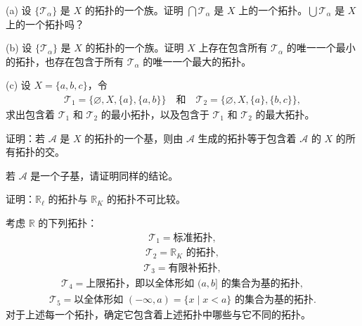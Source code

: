 \documentclass[../../main.tex]{subfiles}
\begin{document}
\begin{exercise}\label{exercise:ch02-拓扑的基-4}
(a) 设 $\{\mathcal{T}_{\alpha}\}$ 是 $X$ 的拓扑的一个族。证明 $\bigcap \mathcal{T}_{\alpha}$ 是 $X$ 上的一个拓扑。$\bigcup \mathcal{T}_{\alpha}$ 是 $X$ 上的一个拓扑吗？

(b) 设 $\{\mathcal{T}_{\alpha}\}$ 是 $X$ 的拓扑的一个族。证明 $X$ 上存在包含所有 $\mathcal{T}_{\alpha}$ 的唯一一个最小的拓扑，也存在包含于所有 $\mathcal{T}_{\alpha}$ 的唯一一个最大的拓扑。

(c) 设 $X = \{a, b, c\}$，令
\begin{align*}
\mathcal{T}_{1} = \{\varnothing, X, \{a\}, \{a, b\}\} \quad \text{和} \quad \mathcal{T}_{2} = \{\varnothing, X, \{a\}, \{b, c\}\},
\end{align*}
求出包含着 $\mathcal{T}_{1}$ 和 $\mathcal{T}_{2}$ 的最小拓扑，以及包含于 $\mathcal{T}_{1}$ 和 $\mathcal{T}_{2}$ 的最大拓扑。
\end{exercise}

\begin{exercise}\label{exercise:ch02-拓扑的基-5}
证明：若 $\mathcal{A}$ 是 $X$ 的拓扑的一个基，则由 $\mathcal{A}$ 生成的拓扑等于包含着 $\mathcal{A}$ 的 $X$ 的所有拓扑的交。

若 $\mathcal{A}$ 是一个子基，请证明同样的结论。
\end{exercise}

\begin{exercise}\label{exercise:ch02-拓扑的基-6}
证明：$\mathbb{R}_{\ell}$ 的拓扑与 $\mathbb{R}_{K}$ 的拓扑不可比较。
\end{exercise}

\begin{exercise}\label{exercise:ch02-拓扑的基-7}
考虑 $\mathbb{R}$ 的下列拓扑：
\begin{align*}
\mathcal{T}_{1} = \text{标准拓扑},
\end{align*}
\begin{align*}
\mathcal{T}_{2} = \mathbb{R}_{K} \text{ 的拓扑},
\end{align*}
\begin{align*}
\mathcal{T}_{3} = \text{有限补拓扑},
\end{align*}
\begin{align*}
\mathcal{T}_{4} = \text{上限拓扑，即以全体形如 } (a, b] \text{ 的集合为基的拓扑},
\end{align*}
\begin{align*}
\mathcal{T}_{5} = \text{以全体形如 } (-\infty, a) = \{x \mid x < a\} \text{ 的集合为基的拓扑}.
\end{align*}
对于上述每一个拓扑，确定它包含着上述拓扑中哪些与它不同的拓扑。
\end{exercise}
\end{document}
